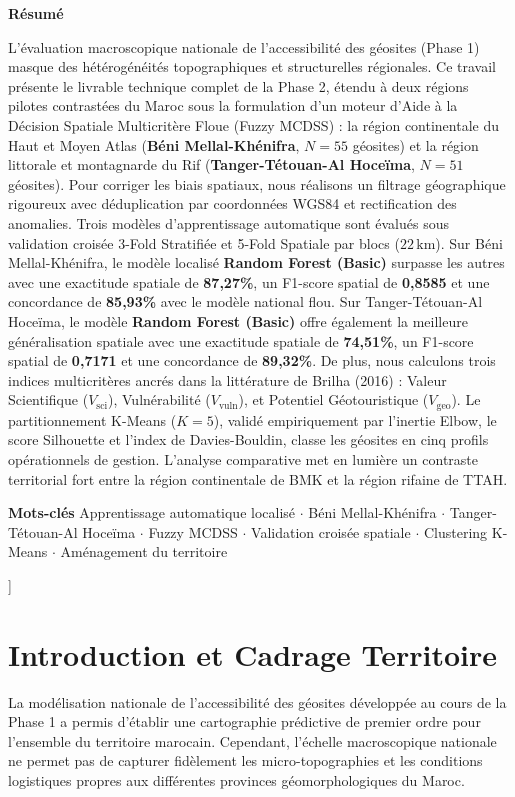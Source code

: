 \documentclass[11pt,twocolumn,a4paper]{article}
\renewenvironment{abstract}{%
    \small\sffamily
    \noindent\textbf{Résumé}\quad
    \selectfont
}{%
    \vspace{0.4cm}
}
\begin{document}
\begin{@twocolumnfalse}
        \begin{abstract}
        L'évaluation macroscopique nationale de l'accessibilité des géosites (Phase 1) masque des hétérogénéités topographiques et structurelles régionales. Ce travail présente le livrable technique complet de la Phase 2, étendu à deux régions pilotes contrastées du Maroc sous la formulation d'un moteur d'Aide à la Décision Spatiale Multicritère Floue (Fuzzy MCDSS) : la région continentale du Haut et Moyen Atlas (\textbf{Béni Mellal-Khénifra}, $N=55$ géosites) et la région littorale et montagnarde du Rif (\textbf{Tanger-Tétouan-Al Hoceïma}, $N=51$ géosites). Pour corriger les biais spatiaux, nous réalisons un filtrage géographique rigoureux avec déduplication par coordonnées WGS84 et rectification des anomalies. Trois modèles d'apprentissage automatique sont évalués sous validation croisée 3-Fold Stratifiée et 5-Fold Spatiale par blocs ($22\,\text{km}$). Sur Béni Mellal-Khénifra, le modèle localisé \textbf{Random Forest (Basic)} surpasse les autres avec une exactitude spatiale de \textbf{87,27\%}, un F1-score spatial de \textbf{0,8585} et une concordance de \textbf{85,93\%} avec le modèle national flou. Sur Tanger-Tétouan-Al Hoceïma, le modèle \textbf{Random Forest (Basic)} offre également la meilleure généralisation spatiale avec une exactitude spatiale de \textbf{74,51\%}, un F1-score spatial de \textbf{0,7171} et une concordance de \textbf{89,32\%}. De plus, nous calculons trois indices multicritères ancrés dans la littérature de Brilha (2016) : Valeur Scientifique ($V_{\text{sci}}$), Vulnérabilité ($V_{\text{vuln}}$), et Potentiel Géotouristique ($V_{\text{geo}}$). Le partitionnement K-Means ($K=5$), validé empiriquement par l'inertie Elbow, le score Silhouette et l'index de Davies-Bouldin, classe les géosites en cinq profils opérationnels de gestion. L'analyse comparative met en lumière un contraste territorial fort entre la région continentale de BMK et la région rifaine de TTAH.
        \end{abstract}
        
        \noindent\textbf{Mots-clés} Apprentissage automatique localisé $\cdot$ Béni Mellal-Khénifra $\cdot$ Tanger-Tétouan-Al Hoceïma $\cdot$ Fuzzy MCDSS $\cdot$ Validation croisée spatiale $\cdot$ Clustering K-Means $\cdot$ Aménagement du territoire
        \vspace{0.8cm}
    \end{@twocolumnfalse}
]

\section{Introduction et Cadrage Territoire}
La modélisation nationale de l'accessibilité des géosites développée au cours de la Phase 1 a permis d'établir une cartographie prédictive de premier ordre pour l'ensemble du territoire marocain. Cependant, l'échelle macroscopique nationale ne permet pas de capturer fidèlement les micro-topographies et les conditions logistiques propres aux différentes provinces géomorphologiques du Maroc.
\end{document}
